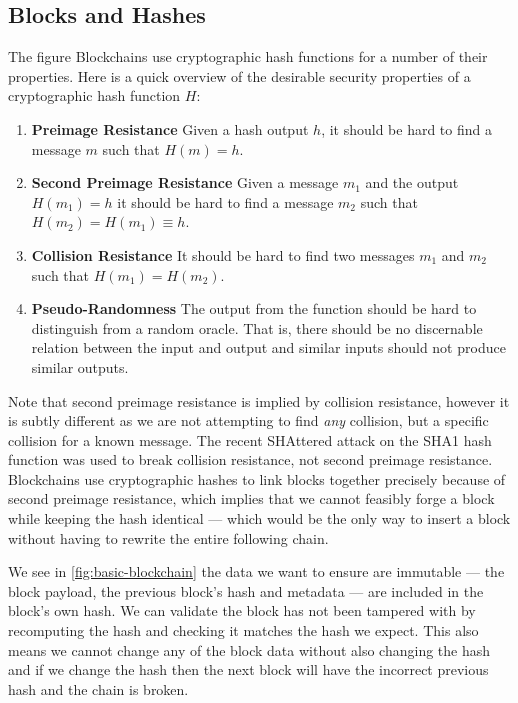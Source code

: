 \subsection{Blocks and Hashes}
\label{ch:blockchain:structure:basics}

The figure Blockchains use cryptographic hash functions for a number of their properties. Here is a quick overview of the desirable security properties of a cryptographic hash function $H$:


\begin{enumerate}
    \item \textbf{Preimage Resistance} Given a hash output $h$, it should be hard to find a message $m$ such that $H(m) = h$.
    \item \textbf{Second Preimage Resistance} Given a message $m_1$ and the output $H(m_1) = h$ it should be hard to find a message $m_2$ such that $H(m_2) = H(m_1) \equiv h$.
    \item \textbf{Collision Resistance} It should be hard to find two messages $m_1$ and $m_2$ such that $H(m_1) = H(m_2)$.
    \item \textbf{Pseudo-Randomness} The output from the function should be hard to distinguish from a random oracle. That is, there should be no discernable relation between the input and output and similar inputs should not produce similar outputs.
\end{enumerate}

Note that second preimage resistance is implied by collision resistance, however it is subtly different as we are not attempting to find \emph{any} collision, but a specific collision for a known message. The recent SHAttered \cite{stevensFirstCollisionFull2017} attack on the SHA1 hash function was used to break collision resistance, not second preimage resistance. Blockchains use cryptographic hashes to link blocks together precisely because of second preimage resistance, which implies that we cannot feasibly forge a block while keeping the hash identical --- which would be the only way to insert a block without having to rewrite the entire following chain.

We see in \autoref{fig:basic-blockchain} the data we want to ensure are immutable --- the block payload, the previous block's hash and metadata --- are included in the block's own hash.  We can validate the block has not been tampered with by recomputing the hash and checking it matches the hash we expect. This also means we cannot change any of the block data without also changing the hash and if we change the hash then the next block will have the incorrect previous hash and the chain is broken.

